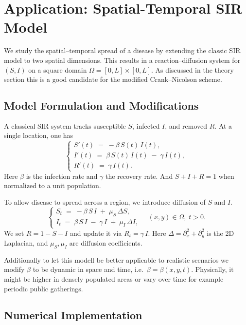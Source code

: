 \section{Application: Spatial-Temporal SIR Model}

We study the spatial--temporal spread of a disease by extending the classic SIR model to two spatial dimensions. 
This results in a reaction--diffusion system for \((S,I)\) on a square domain \(\Omega = [0,L]\times [0,L]\). As
discussed in the theory section this is a good candidate for the modified Crank--Nicolson scheme.

\subsection{Model Formulation and Modifications}

A classical SIR system tracks susceptible \(S\), infected \(I\), and removed \(R\). 
At a single location, one has
\[
  \begin{cases}
    S'(t) \;=\; -\beta\,S(t)\,I(t),\\[4pt]
    I'(t) \;=\; \beta\,S(t)\,I(t)\;-\;\gamma\,I(t),\\[4pt]
    R'(t) \;=\;\gamma\,I(t).
  \end{cases}
\]
Here \(\beta\) is the infection rate and \(\gamma\) the recovery rate. And \(S+I+R=1\) when normalized to a 
unit population.

To allow disease to spread across a region, we introduce diffusion of \(S\) and \(I\).
\[
  \begin{cases}
    S_t \;=\; -\beta\,S\,I \;+\;\mu_S\,\Delta S,\\[6pt]
    I_t \;=\; \beta\,S\,I \;-\;\gamma\,I \;+\;\mu_I\,\Delta I,
  \end{cases}
  \quad (x,y)\in\Omega,\;t>0.
\]
We set \(R=1-S-I\) and update it via \(R_t = \gamma\,I\). Here \(\Delta = \partial_x^2 + \partial_y^2\) is the 2D 
Laplacian, and \(\mu_S,\mu_I\) are diffusion coefficients.


Additionally to let this modell be better applicable to realistic scenarios we modify \(\beta\) to be dynamic in 
space and time, i.e.\ \(\beta = \beta(x,y,t)\). Physically, it might be higher in densely populated areas or 
vary over time for example periodic public gatherings.

\subsection{Numerical Implementation}

